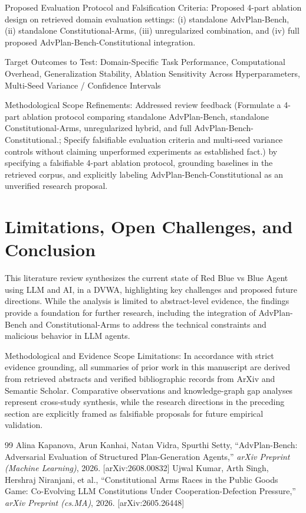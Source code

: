 \documentclass[10pt,twocolumn,letterpaper]{article}
\begin{document}
Proposed Evaluation Protocol and Falsification Criteria: Proposed 4-part ablation design on retrieved domain evaluation settings: (i) standalone AdvPlan-Bench, (ii) standalone Constitutional-Arms, (iii) unregularized combination, and (iv) full proposed AdvPlan-Bench-Constitutional integration.

Target Outcomes to Test: Domain-Specific Task Performance, Computational Overhead, Generalization Stability, Ablation Sensitivity Across Hyperparameters, Multi-Seed Variance / Confidence Intervals

Methodological Scope Refinements: Addressed review feedback (Formulate a 4-part ablation protocol comparing standalone AdvPlan-Bench, standalone Constitutional-Arms, unregularized hybrid, and full AdvPlan-Bench-Constitutional.; Specify falsifiable evaluation criteria and multi-seed variance controls without claiming unperformed experiments as established fact.) by specifying a falsifiable 4-part ablation protocol, grounding baselines in the retrieved corpus, and explicitly labeling AdvPlan-Bench-Constitutional as an unverified research proposal.

\section{Limitations, Open Challenges, and Conclusion}
This literature review synthesizes the current state of Red Blue vs Blue Agent using LLM and AI, in a DVWA, highlighting key challenges and proposed future directions. While the analysis is limited to abstract-level evidence, the findings provide a foundation for further research, including the integration of AdvPlan-Bench and Constitutional-Arms to address the technical constraints and malicious behavior in LLM agents.

Methodological and Evidence Scope Limitations: In accordance with strict evidence grounding, all summaries of prior work in this manuscript are derived from retrieved abstracts and verified bibliographic records from ArXiv and Semantic Scholar. Comparative observations and knowledge-graph gap analyses represent cross-study synthesis, while the research directions in the preceding section are explicitly framed as falsifiable proposals for future empirical validation.

\begin{thebibliography}{99}
 Alina Kapanova, Arun Kanhai, Natan Vidra, Spurthi Setty, ``AdvPlan-Bench: Adversarial Evaluation of Structured Plan-Generation Agents,'' \textit{arXiv Preprint (Machine Learning)}, 2026. [arXiv:2608.00832]
 Ujwal Kumar, Arth Singh, Hershraj Niranjani, et al., ``Constitutional Arms Races in the Public Goods Game: Co-Evolving LLM Constitutions Under Cooperation-Defection Pressure,'' \textit{arXiv Preprint (cs.MA)}, 2026. [arXiv:2605.26448]
\end{thebibliography}
\end{document}
